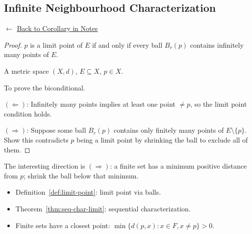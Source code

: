 
\subsection*{Infinite Neighbourhood Characterization}
\label{prf:inf-nbhd}

\begin{remark*}[Return]
$\leftarrow$ \hyperref[cor:inf-nbhd]{Back to Corollary in Notes}
\end{remark*}

\begin{proof}
\Claim $p$ is a limit point of $E$ if and only if every ball $B_r(p)$
contains infinitely many points of $E$.

\Given A metric space $(X,d)$, $E \subseteq X$, $p \in X$.

\Goal To prove the biconditional.

\Strategy
$(\Leftarrow)$: Infinitely many points implies at least one point
$\neq p$, so the limit point condition holds.

$(\Rightarrow)$: Suppose some ball $B_r(p)$ contains only finitely many
points of $E \setminus \{p\}$. Show this contradicts $p$ being a limit
point by shrinking the ball to exclude all of them.


\end{proof}

\begin{remark*}
The interesting direction is $(\Rightarrow)$: a finite set has a minimum
positive distance from $p$; shrink the ball below that minimum.
\end{remark*}

\begin{remark*}[Dependencies]
\begin{itemize}
  \item Definition~\ref{def:limit-point}: limit point via balls.
  \item Theorem~\ref{thm:seq-char-limit}: sequential characterization.
  \item Finite sets have a closest point: $\min\{d(p,x) : x \in F, x \neq p\} > 0$.
\end{itemize}
\end{remark*}
